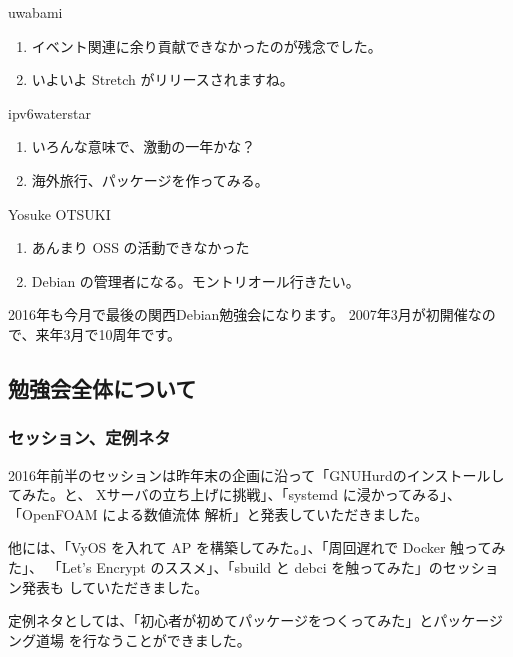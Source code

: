 \documentclass[mingoth,a4paper]{jsarticle}
\begin{document}
\begin{prework}{ uwabami }
  \begin{enumerate}
  \item イベント関連に余り貢献できなかったのが残念でした。
  \item いよいよ Stretch がリリースされますね。
  \end{enumerate}
\end{prework}

\begin{prework}{ ipv6waterstar }
  \begin{enumerate}
  \item いろんな意味で、激動の一年かな？
  \item 海外旅行、パッケージを作ってみる。
  \end{enumerate}
\end{prework}

\begin{prework}{ Yosuke OTSUKI }
  \begin{enumerate}
  \item あんまり OSS  の活動できなかった
  \item Debian の管理者になる。モントリオール行きたい。
  \end{enumerate}
\end{prework}


2016年も今月で最後の関西Debian勉強会になります。
2007年3月が初開催なので、来年3月で10周年です。

\subsection{勉強会全体について}

\subsubsection{セッション、定例ネタ}

2016年前半のセッションは昨年末の企画に沿って「GNUHurdのインストールしてみた。と、
Xサーバの立ち上げに挑戦」、「systemd に浸かってみる」、「OpenFOAM による数値流体
解析」と発表していただきました。

他には、「VyOS を入れて AP を構築してみた。」、「周回遅れで Docker 触ってみた」、
「Let’s Encrypt のススメ」、「sbuild と debci を触ってみた」のセッション発表も
していただきました。

定例ネタとしては、「初心者が初めてパッケージをつくってみた」とパッケージング道場
を行なうことができました。
\end{document}
